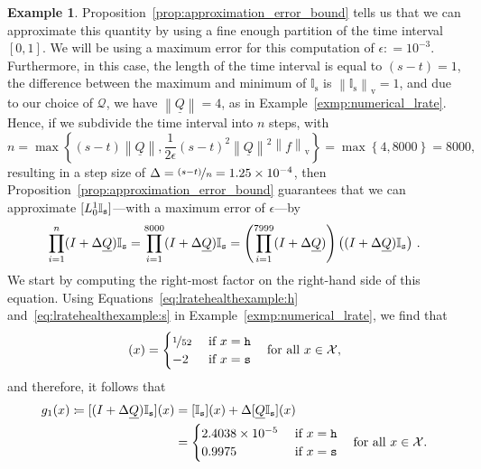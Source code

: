 \documentclass[10pt,a4paper]{paper}
\theoremstyle{definition}
\newtheorem{exmp}{Example}
\newcommand{\states}{\mathcal{X}}
\newcommand{\ind}[1]{\mathbb{I}_{#1}}
\newcommand{\rateset}{\mathcal{Q}}
\newcommand{\lrate}{\underline{Q}}
\newcommand{\norm}[1]{\left\lVert #1 \right\rVert}
\newcommand{\coloneqq}{:\!=}
\begin{document}
\begin{exmp}
Proposition~\ref{prop:approximation_error_bound} tells us that we can approximate this quantity by using a fine enough partition of the time interval $[0,1]$. We will be using a maximum error for this computation of $\epsilon\coloneqq 10^{-3}$. Furthermore, in this case, the length of the time interval is equal to $(s-t)=1$, the difference between the maximum and minimum of $\ind{\text{s}}$ is $\norm{\ind{\text{s}}}_\mathrm{v}=1$, and due to our choice of $\rateset$, we have $\norm{\lrate} = 4$, as in Example~\ref{exmp:numerical_lrate}. Hence, if we subdivide the time interval into $n$ steps, with
\begin{equation*}
n=\max\left\{
(s-t)\norm{\lrate},
\frac{1}{2\epsilon}(s-t)^2\norm{\lrate}^2\norm{f}_\mathrm{v}
\right\}
=\max\left\{4,8000\right\}=8000,
\end{equation*}
resulting in a step size of $\Delta=\nicefrac{(s-t)}{n}=1.25\times 10^{-4}$, then Proposition~\ref{prop:approximation_error_bound} guarantees that we can approximate $[L_0^1\ind{\text{{\tt s}}}]$---with a maximum error of $\epsilon$---by
\begin{equation*}
\prod_{i=1}^n(I + \Delta\lrate)\ind{\text{{\tt s}}} = \prod_{i=1}^{8000}(I + \Delta\lrate)\ind{\text{{\tt s}}} = \left(\prod_{i=1}^{7999}(I + \Delta\lrate)\right)\left((I+\Delta\lrate)\ind{\text{{\tt s}}}\right)\,.
\end{equation*}
We start by computing the right-most factor on the right-hand side of this equation. Using Equations~\eqref{eq:lratehealthexample:h} and~\eqref{eq:lratehealthexample:s} in Example~\ref{exmp:numerical_lrate}, we find that
\begin{equation*}
[\lrate\ind{\text{{\tt s}}}](x)
=
\begin{cases}
\nicefrac{1}{52}
&\text{ if $x=\text{\tt h}$}\\
-2
&\text{ if $x=\text{\tt s}$}
\end{cases}
~~~\text{for all $x\in\states$},
\end{equation*}
and therefore, it follows that
\begin{align*}
g_1(x)\coloneqq[(I + \Delta\lrate)\ind{\text{{\tt s}}}](x)
&= [\ind{\text{{\tt s}}}](x) + \Delta[\lrate\ind{\text{{\tt s}}}](x)\\
&=
\begin{cases}
2.4038\times 10^{-5}
&\text{ if $x=\text{\tt h}$}\\
0.9975
&\text{ if $x=\text{\tt s}$}
\end{cases}
~~~\text{for all $x\in\states$.}\\

\end{align*}
\end{exmp}
\end{document}

